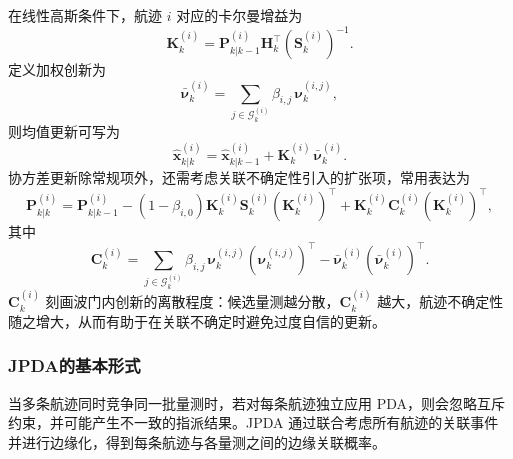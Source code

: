\documentclass{xdupgthesis}
\begin{document}
在线性高斯条件下，航迹 $i$ 对应的卡尔曼增益为
\begin{equation}
	\mathbf{K}^{(i)}_k
	=
	\mathbf{P}^{(i)}_{k|k-1}\mathbf{H}_k^\top
	\left(\mathbf{S}^{(i)}_k\right)^{-1}.
\end{equation}
定义加权创新为
\begin{equation}
	\bar{\boldsymbol{\nu}}^{(i)}_k
	=
	\sum_{j\in\mathcal{G}^{(i)}_k}\beta_{i,j}\,\boldsymbol{\nu}^{(i,j)}_k,
\end{equation}
则均值更新可写为
\begin{equation}
	\hat{\mathbf{x}}^{(i)}_{k|k}
	=
	\hat{\mathbf{x}}^{(i)}_{k|k-1}
	+
	\mathbf{K}^{(i)}_k\,\bar{\boldsymbol{\nu}}^{(i)}_k.
\end{equation}
协方差更新除常规项外，还需考虑关联不确定性引入的扩张项，常用表达为
\begin{equation}
	\mathbf{P}^{(i)}_{k|k}
	=
	\mathbf{P}^{(i)}_{k|k-1}
	-
	\left(1-\beta_{i,0}\right)\mathbf{K}^{(i)}_k\mathbf{S}^{(i)}_k\left(\mathbf{K}^{(i)}_k\right)^\top
	+
	\mathbf{K}^{(i)}_k \mathbf{C}^{(i)}_k \left(\mathbf{K}^{(i)}_k\right)^\top,
\end{equation}
其中
\begin{equation}
	\mathbf{C}^{(i)}_k
	=
	\sum_{j\in\mathcal{G}^{(i)}_k}\beta_{i,j}\,
	\boldsymbol{\nu}^{(i,j)}_k
	\left(\boldsymbol{\nu}^{(i,j)}_k\right)^\top
	-
	\bar{\boldsymbol{\nu}}^{(i)}_k
	\left(\bar{\boldsymbol{\nu}}^{(i)}_k\right)^\top.
\end{equation}
$\mathbf{C}^{(i)}_k$ 刻画波门内创新的离散程度：候选量测越分散，$\mathbf{C}^{(i)}_k$ 越大，航迹不确定性随之增大，从而有助于在关联不确定时避免过度自信的更新。

\subsubsection{JPDA的基本形式}

当多条航迹同时竞争同一批量测时，若对每条航迹独立应用 PDA，则会忽略互斥约束，并可能产生不一致的指派结果。JPDA 通过联合考虑所有航迹的关联事件并进行边缘化，得到每条航迹与各量测之间的边缘关联概率。
\end{document}
